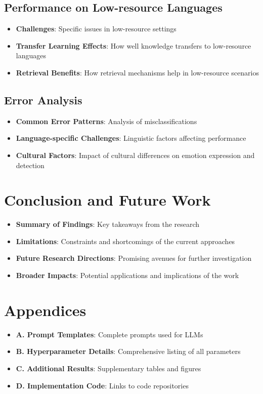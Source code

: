 \documentclass[a4paper,12pt]{extarticle}
\begin{document}
\subsection{Performance on Low-resource Languages}
\begin{itemize}
\item \textbf{Challenges}: Specific issues in low-resource settings
\item \textbf{Transfer Learning Effects}: How well knowledge transfers to low-resource languages
\item \textbf{Retrieval Benefits}: How retrieval mechanisms help in low-resource scenarios
\end{itemize}

\subsection{Error Analysis}
\begin{itemize}
\item \textbf{Common Error Patterns}: Analysis of misclassifications
\item \textbf{Language-specific Challenges}: Linguistic factors affecting performance
\item \textbf{Cultural Factors}: Impact of cultural differences on emotion expression and detection
\end{itemize}

\section{Conclusion and Future Work}
\begin{itemize}
\item \textbf{Summary of Findings}: Key takeaways from the research
\item \textbf{Limitations}: Constraints and shortcomings of the current approaches
\item \textbf{Future Research Directions}: Promising avenues for further investigation
\item \textbf{Broader Impacts}: Potential applications and implications of the work
\end{itemize}

\printbibliography

\section*{Appendices}
\begin{itemize}
\item \textbf{A. Prompt Templates}: Complete prompts used for LLMs
\item \textbf{B. Hyperparameter Details}: Comprehensive listing of all parameters
\item \textbf{C. Additional Results}: Supplementary tables and figures
\item \textbf{D. Implementation Code}: Links to code repositories
\end{itemize}
\end{document}
